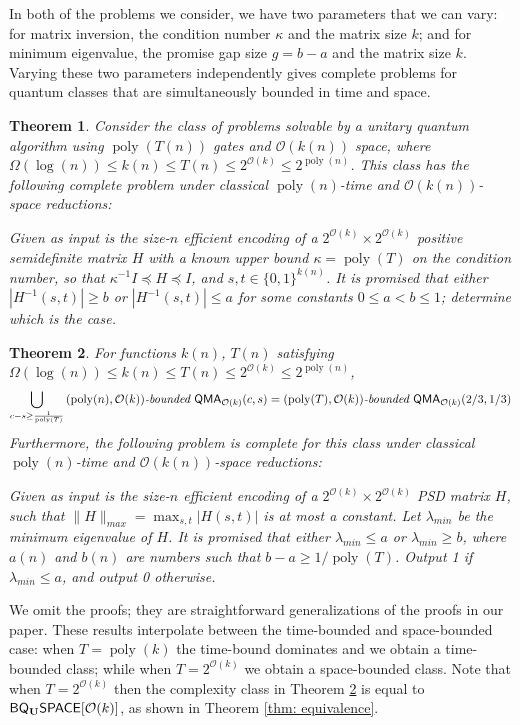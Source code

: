 \documentclass[11pt]{article}
\newtheorem{theorem}{Theorem}
\theoremstyle{definition}
\theoremstyle{remark}
\newcommand\QMA{{\sf{QMA}}}
\newcommand\bddQMA[5]{{\left(#1,#2\right)}\textit{-bounded }\QMA_{#3}(#4,#5)}
\newcommand{\classfont}{\sf}
\newcommand{\Unitary}{\mathbf{U}}
\newcommand{\unitaryBQSPACE}[1]{{\classfont{BQ}_\Unitary\classfont{SPACE}}[#1]}
\newcommand\bigoh{\mathcal{O}}
\DeclareMathOperator{\poly}{poly}
\begin{document}
In both of the problems we consider, we have two parameters that we can vary: for matrix inversion, the condition number $\kappa$ and the matrix size $k$; and for minimum eigenvalue, the promise gap size $g=b-a$ and the matrix size $k$. Varying these two parameters independently gives complete problems for quantum classes that are simultaneously bounded in time and space.

\begin{theorem}
Consider the class of problems solvable by a unitary quantum algorithm using $\poly(T(n))$ gates and $\bigoh(k(n))$ space, where $\Omega(\log(n)) \le k(n) \le T(n) \le 2^{\bigoh(k)} \le 2^{\poly(n)}$. This class has the following complete problem under classical $\poly(n)$-time and $\bigoh(k(n))$-space reductions:

Given as input is the size-$n$ efficient encoding of a $2^{\bigoh(k)} \times 2^{\bigoh(k)}$ positive semidefinite matrix $H$ with a known upper bound $\kappa = \poly(T)$ on the condition number, so that $\kappa^{-1}I\preceq H \preceq I$, and $s,t\in \lbrace 0,1\rbrace^{k(n)}$. It is promised that either $|H^{-1}(s,t)|\geq b$
 or $|H^{-1}(s,t)|\leq a$ for some constants $0 \le a < b \le 1$; determine which is the case.
\end{theorem}

\begin{theorem} \label{thm: time space qma}
For functions $k(n)$, $T(n)$ satisfying $\Omega(\log(n)) \le k(n) \le T(n) \le 2^{\bigoh(k)} \le 2^{\poly(n)}$,
\begin{equation}
\bigcup_{c-s\ge \frac{1}{\poly(T)}} \bddQMA{\poly(n)}{\bigoh(k)}{\bigoh(k)}{c}{s} = \bddQMA{\poly(T)}{\bigoh(k)}{\bigoh(k)}{2/3}{1/3} \nonumber
\end{equation}
Furthermore, the following problem is complete for this class under classical $\poly(n)$-time and $\bigoh(k(n))$-space reductions:

Given as input is the size-$n$ efficient encoding of a $2^{\bigoh(k)} \times 2^{\bigoh(k)}$ PSD matrix $H$, such that %
$\|H\|_{max} = \max_{s,t}|H(s,t)|$ is at most a constant. Let $\lambda_{min}$ be the minimum eigenvalue of $H$. It is promised that either $\lambda_{min} \le a$ or $\lambda_{min} \ge b$, where $a(n)$ and $b(n)$ are numbers such that $b-a \ge 1/\poly(T)$. Output 1 if $\lambda_{min} \le a$, and output 0 otherwise.
\end{theorem}

We omit the proofs; they are straightforward generalizations of the proofs in our paper. These results interpolate between the time-bounded and space-bounded case: when $T = \poly(k)$ the time-bound dominates and we obtain a time-bounded class; while when $T = 2^{\bigoh(k)}$ we obtain a space-bounded class. Note that when $T = 2^{\bigoh(k)}$ then the complexity class in Theorem \ref{thm: time space qma} is equal to $\unitaryBQSPACE{\bigoh(k)}$, as shown in Theorem \ref{thm: equivalence}.
\end{document}
